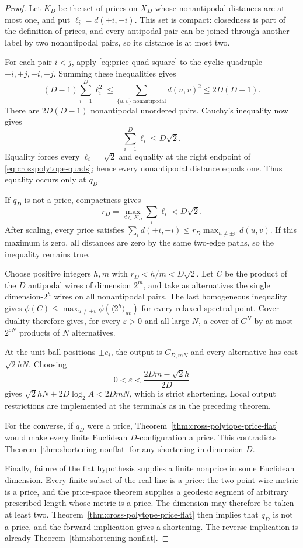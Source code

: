 \begin{proof}
Let $K_D$ be the set of prices on $X_D$ whose nonantipodal distances are at most one, and put $\ell_i=d(+i,-i)$. This set is compact: closedness is part of the definition of prices, and every antipodal pair can be joined through another label by two nonantipodal pairs, so its distance is at most two.

For each pair $i<j$, apply \eqref{eq:price-quad-square} to the cyclic quadruple $+i,+j,-i,-j$. Summing these inequalities gives
\begin{equation}\label{eq:crosspolytope-quads}
 (D-1)\sum_{i=1}^D\ell_i^2
 \leq\sum_{\{u,v\}\text{ nonantipodal}}d(u,v)^2
 \leq2D(D-1).
\end{equation}
There are $2D(D-1)$ nonantipodal unordered pairs. Cauchy's inequality now gives
\[
 \sum_{i=1}^D\ell_i\leq D\sqrt2.
\]
Equality forces every $\ell_i=\sqrt2$ and equality at the right endpoint of \eqref{eq:crosspolytope-quads}; hence every nonantipodal distance equals one. Thus equality occurs only at $q_D$.

If $q_D$ is not a price, compactness gives
\[
 r_D=\max_{d\in K_D}\sum_i\ell_i<D\sqrt2.
\]
After scaling, every price satisfies $\sum_i d(+i,-i)\leq r_D\max_{u\ne\pm v}d(u,v)$. If this maximum is zero, all distances are zero by the same two-edge paths, so the inequality remains true.

Choose positive integers $h,m$ with $r_D<h/m<D\sqrt2$. Let $C$ be the product of the $D$ antipodal wires of dimension $2^m$, and take as alternatives the single dimension-$2^h$ wires on all nonantipodal pairs. The last homogeneous inequality gives $\phi(C)\leq\max_{u\ne\pm v}\phi(\langle2^h\rangle_{uv})$ for every relaxed spectral point. Cover duality therefore gives, for every $\varepsilon>0$ and all large $N$, a cover of $C^N$ by at most $2^{\varepsilon N}$ products of $N$ alternatives.

At the unit-ball positions $\pm e_i$, the output is $C_{D,mN}$ and every alternative has cost $\sqrt2hN$. Choosing
\[
 0<\varepsilon<\frac{2Dm-\sqrt2h}{2D}
\]
gives $\sqrt2hN+2D\log_2 A<2DmN$, which is strict shortening. Local output restrictions are implemented at the terminals as in the preceding theorem.

For the converse, if $q_D$ were a price, Theorem~\ref{thm:cross-polytope-price-flat} would make every finite Euclidean $D$-configuration a price. This contradicts Theorem~\ref{thm:shortening-nonflat} for any shortening in dimension $D$.

Finally, failure of the flat hypothesis supplies a finite nonprice in some Euclidean dimension. Every finite subset of the real line is a price: the two-point wire metric is a price, and the price-space theorem supplies a geodesic segment of arbitrary prescribed length whose metric is a price. The dimension may therefore be taken at least two. Theorem~\ref{thm:cross-polytope-price-flat} then implies that $q_D$ is not a price, and the forward implication gives a shortening. The reverse implication is already Theorem~\ref{thm:shortening-nonflat}.
\end{proof}

